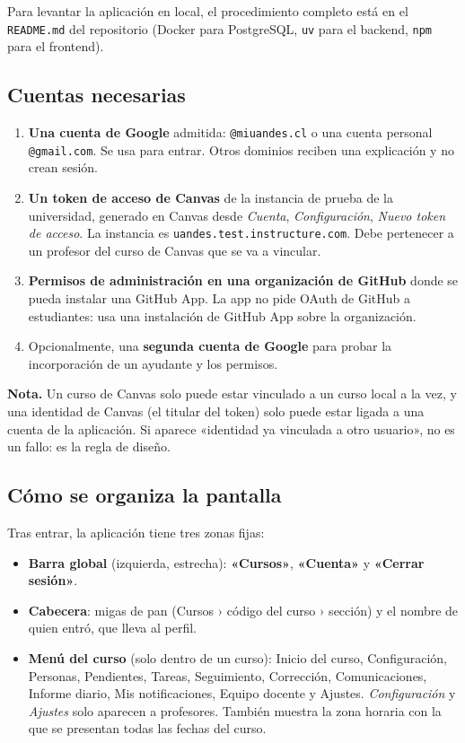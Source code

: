 \documentclass[11pt,a4paper]{article}
\newenvironment{nota}
  {\def\FrameCommand{\fcolorbox{ambar}{ambarfondo}}\MakeFramed{\advance\hsize-\width\FrameRestore}\noindent\textbf{\textcolor{ambar}{Nota.}} }
  {\endMakeFramed}
\newcommand{\ui}[1]{\textbf{«#1»}}        %
\begin{document}
Para levantar la aplicación en local, el procedimiento completo está en el \texttt{README.md} del repositorio (Docker para PostgreSQL, \texttt{uv} para el backend, \texttt{npm} para el frontend).

\subsection{Cuentas necesarias}

\begin{enumerate}
  \item \textbf{Una cuenta de Google} admitida: \texttt{@miuandes.cl} o una cuenta personal \texttt{@gmail.com}. Se usa para entrar. Otros dominios reciben una explicación y no crean sesión.
  \item \textbf{Un token de acceso de Canvas} de la instancia de prueba de la universidad, generado en Canvas desde \emph{Cuenta}, \emph{Configuración}, \emph{Nuevo token de acceso}. La instancia es \texttt{uandes.test.instructure.com}. Debe pertenecer a un profesor del curso de Canvas que se va a vincular.
  \item \textbf{Permisos de administración en una organización de GitHub} donde se pueda instalar una GitHub App. La app no pide OAuth de GitHub a estudiantes: usa una instalación de GitHub App sobre la organización.
  \item Opcionalmente, una \textbf{segunda cuenta de Google} para probar la incorporación de un ayudante y los permisos.
\end{enumerate}

\begin{nota}
Un curso de Canvas solo puede estar vinculado a un curso local a la vez, y una identidad de Canvas (el titular del token) solo puede estar ligada a una cuenta de la aplicación. Si aparece «identidad ya vinculada a otro usuario», no es un fallo: es la regla de diseño.
\end{nota}

\subsection{Cómo se organiza la pantalla}

Tras entrar, la aplicación tiene tres zonas fijas:

\begin{itemize}
  \item \textbf{Barra global} (izquierda, estrecha): \ui{Cursos}, \ui{Cuenta} y \ui{Cerrar sesión}.
  \item \textbf{Cabecera}: migas de pan (Cursos › código del curso › sección) y el nombre de quien entró, que lleva al perfil.
  \item \textbf{Menú del curso} (solo dentro de un curso): Inicio del curso, Configuración, Personas, Pendientes, Tareas, Seguimiento, Corrección, Comunicaciones, Informe diario, Mis notificaciones, Equipo docente y Ajustes. \emph{Configuración} y \emph{Ajustes} solo aparecen a profesores. También muestra la zona horaria con la que se presentan todas las fechas del curso.
\end{itemize}
\end{document}
